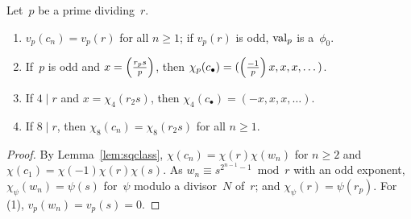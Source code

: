 \begin{lemma}[Primes of~$r$]
  \label{lem:pat-r}
  \leanok
  Let~$p$ be a prime dividing~$r$.
  \begin{enumerate}
    \item $v_p(c_n) = v_p(r)$ for all $n \ge 1$; if $v_p(r)$ is odd, $\operatorname{val}_p$ is a~$\phi_0$.
    \item If~$p$ is odd and $x = \left(\frac{r_p s}{p}\right)$, then
          $\chi_p(c_\bullet) = (\left(\frac{-1}{p}\right) x, x, x, \dots)$.
    \item If $4 \mid r$ and $x = \chi_4(r_2 s)$, then $\chi_4(c_\bullet) = (-x, x, x, \dots)$.
    \item If $8 \mid r$, then $\chi_8(c_n) = \chi_8(r_2 s)$ for all $n \ge 1$.
  \end{enumerate}
\end{lemma}
\begin{proof}
  \leanok
  By Lemma~\ref{lem:sqclass}, $\chi(c_n) = \chi(r)\chi(w_n)$ for $n \ge 2$ and
  $\chi(c_1) = \chi(-1)\chi(r)\chi(s)$. As $w_n \equiv s^{2^{n-1}-1} \bmod r$ with an odd
  exponent, $\chi_\psi(w_n) = \psi(s)$ for~$\psi$ modulo a divisor~$N$ of~$r$; and
  $\chi_\psi(r) = \psi(r_p)$. For (1), $v_p(w_n) = v_p(s) = 0$.
\end{proof}

